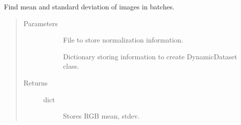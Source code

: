 \documentclass[letterpaper,10pt,english]{sphinxmanual}
\begin{document}

\begin{fulllineitems}
\label{\detokenize{index:pathflowai.datasets.get_normalizer}}
Find mean and standard deviation of images in batches.
\begin{quote}\begin{description}
\item[{Parameters}] \leavevmode\begin{description}
\item[{}] \leavevmode
File to store normalization information.

\item[{}] \leavevmode
Dictionary storing information to create DynamicDataset class.

\end{description}

\item[{Returns}] \leavevmode\begin{description}
\item[{dict}] \leavevmode
Stores RGB mean, stdev.

\end{description}

\end{description}\end{quote}

\end{fulllineitems}

\end{document}
